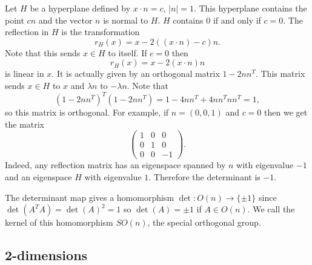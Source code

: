 \documentclass[12pt]{article}
\begin{document}
\begin{exm}
  Let $H$ be a hyperplane defined by $x\cdot n=c$, $|n|=1$. This hyperplane contains the point $cn$ and the vector $n$ is normal to $H$. $H$ contains $0$ if and only if $c=0$. The reflection in $H$ is the transformation
  \[r_H(x)=x-2((x\cdot n)-c)n.\]
  Note that this sends $x\in H$ to itself. If $c=0$ then
  \[r_H(x)=x-2(x\cdot n)n\]
  is linear in $x$. It is actually given by an orthogonal matrix $1-2nn^T$. This matrix sends $x\in H$ to $x$ and $\lambda n$ to $-\lambda n$. Note that
  \[\left(1-2nn^T\right)^T\left(1-2nn^T\right)=1-4nn^T+4nn^Tnn^T=1,\]
  so this matrix is orthogonal. For example, if $n=(0,0,1)$ and $c=0$ then we get the matrix
  \[\left(\begin{array}{ccc}
    1 & 0 & 0\\
    0 & 1 & 0\\
    0 & 0 & -1
  \end{array}\right).\]
  Indeed, any reflection matrix has an eigenspace spanned by $n$ with eigenvalue $-1$ and an eigenspace $H$ with eigenvalue $1$. Therefore the determinant is $-1$.
\end{exm}

\begin{dfn}
  The determinant map gives a homomorphism $\det\colon O(n)\to\{\pm 1\}$ since $\det(A^TA)=\det(A)^2=1$ so $\det(A)=\pm 1$ if $A\in O(n)$. We call the kernel of this homomorphism $SO(n)$, the special orthogonal group.
\end{dfn}

\subsection{2-dimensions}
\end{document}
